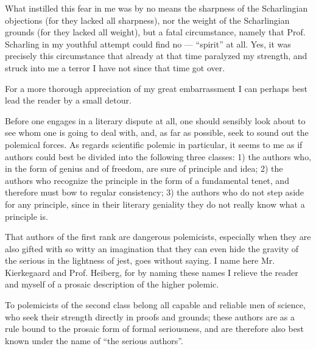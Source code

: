 \documentclass[12pt,a4paper,openany]{book}
\newcommand{\opage}[1]{\marginnote{\footnotesize\textit{[#1]}}}
\begin{document}
\setcounter{footnote}{0}%
\opage{10}What instilled this fear in me was by no means
the sharpness of the Scharlingian objections (for they lacked
all sharpness), nor the weight of the Scharlingian grounds
(for they lacked all weight), but a fatal circumstance,
namely that Prof. Scharling in my youthful attempt
could find no --- ``spirit'' at all. Yes,
it was precisely this circumstance that already at that time
paralyzed my strength, and struck into me a terror I have not
since that time got over.

For a more thorough appreciation of my great embarrassment
I can perhaps best lead the reader by a
small detour.

Before one engages in a literary dispute at all,
one should sensibly look about to see whom one is going
to deal with, and, as far as possible, seek to sound out the polemical
forces. As regards scientific polemic in particular,
it seems to me as if authors could best
be divided into the following three classes: 1) the authors
who, in the form of genius and of freedom, are sure of
principle and idea; 2) the authors who recognize the principle
in the form of a fundamental tenet, and therefore must bow
to regular consistency; 3) the authors who do not
step aside for any principle, since in their literary
geniality they do not really know what a principle is.

That authors of the first rank are dangerous polemicists,
especially when they are also gifted with so witty
an imagination that they can even hide the gravity of the serious
in the lightness of jest, goes without saying. I
name here Mr. Kierkegaard and Prof. Heiberg, for by
naming these names I relieve the reader and myself
of a prosaic description of the higher polemic.

To polemicists of the second class belong all capable
\setcounter{footnote}{0}%
\opage{11}and reliable men of science, who seek their strength directly %
in proofs and grounds; these authors are as a rule
bound to the prosaic form of formal seriousness,
and are therefore also best known under the name of ``the serious
authors''.
\end{document}
